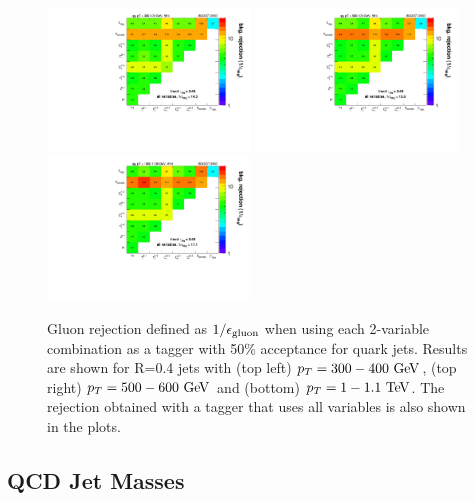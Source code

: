 \begin{figure}
\centering
\includegraphics[width=0.48\textwidth]{./Figures/QGTagging/pT300/AKtR04/effBkg2D.pdf}
\includegraphics[width=0.48\textwidth]{./Figures/QGTagging/pT500/AKtR04/effBkg2D.pdf}
\includegraphics[width=0.48\textwidth]{./Figures/QGTagging/pT1000/AKtR04/effBkg2D.pdf}
\caption{Gluon rejection defined as $1/\epsilon_{\rm gluon}$ when using each 2-variable combination 
as a tagger with 50\% acceptance for quark jets. Results are shown for R=0.4 jets with (top left) $\pt=300-400 \GeV$, 
(top right) $\pt=500-600 \GeV$ and (bottom) $\pt=1-1.1 \TeV$. The rejection obtained with a tagger that uses all variables is also shown
in the plots. }
\label{fig:qg_akt4_comb}
\end{figure}






\subsection{QCD Jet Masses}\label{sec:qg_mass}

